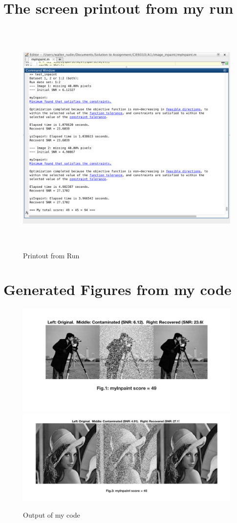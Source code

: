 \documentclass[11pt]{article}
\begin{document}
\section*{The screen printout from my run}
\begin{figure}[H]
\centering
\includegraphics[height=12cm]{Print_out}
\caption{Printout from Run}
\label{Printout from Run}
\end{figure}
\clearpage
\section*{Generated Figures from my code}
\begin{figure}[H]
\centering
\includegraphics[width=14cm]{Fig_1}
\includegraphics[width=14cm]{Fig_3}
\caption{Output of my code}
\end{figure}
\end{document}
